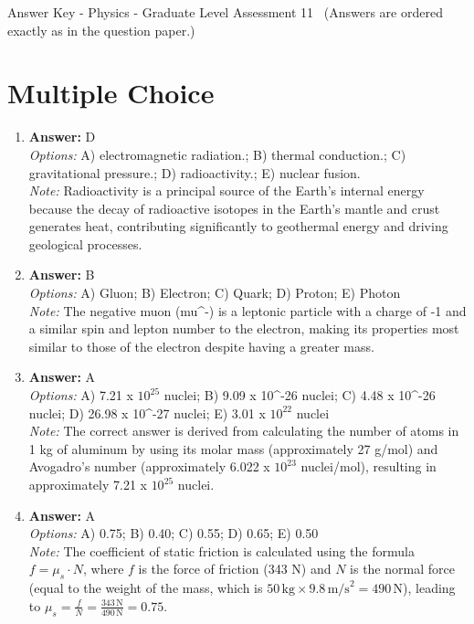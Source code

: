 \documentclass[12pt]{article}
\begin{document}
\begin{center}
Answer Key - Physics - Graduate Level Assessment 11 \
\small (Answers are ordered exactly as in the question paper.)
\end{center}

\section*{Multiple Choice}
\begin{enumerate}[label=\arabic*.]
\item \textbf{Answer:} D
\\ \textit{Options:} A) electromagnetic radiation.; B) thermal conduction.; C) gravitational pressure.; D) radioactivity.; E) nuclear fusion.
\\ \textit{Note:} Radioactivity is a principal source of the Earth's internal energy because the decay of radioactive isotopes in the Earth's mantle and crust generates heat, contributing significantly to geothermal energy and driving geological processes.
\item \textbf{Answer:} B
\\ \textit{Options:} A) Gluon; B) Electron; C) Quark; D) Proton; E) Photon
\\ \textit{Note:} The negative muon (mu^-) is a leptonic particle with a charge of -1 and a similar spin and lepton number to the electron, making its properties most similar to those of the electron despite having a greater mass.
\item \textbf{Answer:} A
\\ \textit{Options:} A) 7.21 x $10^25$ nuclei; B) 9.09 x 10^-26 nuclei; C) 4.48 x 10^-26 nuclei; D) 26.98 x 10^-27 nuclei; E) 3.01 x $10^22$ nuclei
\\ \textit{Note:} The correct answer is derived from calculating the number of atoms in 1 kg of aluminum by using its molar mass (approximately 27 g/mol) and Avogadro's number (approximately 6.022 x $10^23$ nuclei/mol), resulting in approximately 7.21 x $10^25$ nuclei.
\item \textbf{Answer:} A
\\ \textit{Options:} A) 0.75; B) 0.40; C) 0.55; D) 0.65; E) 0.50
\\ \textit{Note:} The coefficient of static friction is calculated using the formula \( f = \mu_s \cdot N \), where \( f \) is the force of friction (343 N) and \( N \) is the normal force (equal to the weight of the mass, which is \( 50 \, \text{kg} \times 9.8 \, \text{m/s}^2 = 490 \, \text{N} \)), leading to \( \mu_s = \frac{f}{N} = \frac{343 \, \text{N}}{490 \, \text{N}} = 0.75 \).

\end{enumerate}
\end{document}

